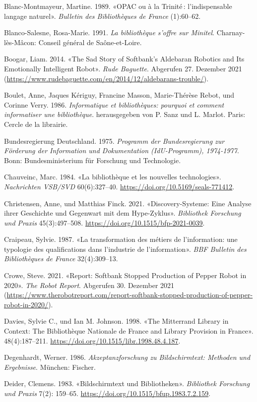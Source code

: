 \documentclass[a4paper,
fontsize=11pt,
oneside,
numbers=noperiodatend,
parskip=half-,
bibliography=totoc,
final
]{scrartcl}
\begin{document}
Blanc-Montmayeur, Martine. 1989. «OPAC ou à la Trinité\,:
l'indispensable langage naturel». \emph{Bulletin des Bibliothèques de
France} (1):60--62.

Blanco-Salesne, Rosa-Marie. 1991. \emph{La bibliothèque s'offre sur
Minitel}. Charnay-lès-Mâcon: Conseil général de Saône-et-Loire.

Boogar, Liam. 2014. «The Sad Story of Softbank's Aldebaran Robotics and
Its Emotionally Intelligent Robot». \emph{Rude Baguette}. Abgerufen 27.
Dezember 2021
(\url{https://www.rudebaguette.com/en/2014/12/aldebarans-trouble/}).

Boulet, Anne, Jaques Kériguy, Francine Masson, Marie-Thérèse Rebot, und
Corinne Verry. 1986. \emph{Informatique et bibliothèques: pourquoi et
comment informatiser une bibliothèque}. herausgegeben von P. Sanz und L.
Marlot. Paris: Cercle de la librairie.

Bundesregierung Deutschland. 1975. \emph{Programm der Bundesregierung
zur Förderung der Information und Dokumentation (IdU-Programm),
1974-1977}. Bonn: Bundesministerium für Forschung und Technologie.

Chauveinc, Marc. 1984. «La bibliothèque et les nouvelles technologies».
\emph{Nachrichten VSB/SVD} 60(6):327--40.
\url{https://doi.org/10.5169/seals-771412}.

Christensen, Anne, und Matthias Finck. 2021. «Discovery-Systeme: Eine
Analyse ihrer Geschichte und Gegenwart mit dem Hype-Zyklus».
\emph{Bibliothek Forschung und Praxis} 45(3):497--508.
\url{https://doi.org/10.1515/bfp-2021-0039}.

Craipeau, Sylvie. 1987. «La transformation des métiers de l'information:
une typologie des qualifications dans l'industrie de l'information».
\emph{BBF Bulletin des Bibliothèques de France} 32(4):309--13.

Crowe, Steve. 2021. «Report: Softbank Stopped Production of Pepper Robot
in 2020». \emph{The Robot Report}. Abgerufen 30. Dezember 2021
(\url{https://www.therobotreport.com/report-softbank-stopped-production-of-pepper-robot-in-2020/}).

Davies, Sylvie C., und Ian M. Johnson. 1998. «The Mitterrand Library in
Context: The Bibliothèque Nationale de France and Library Provision in
France». 48(4):187--211.
\url{https://doi.org/10.1515/libr.1998.48.4.187}.

Degenhardt, Werner. 1986. \emph{Akzeptanzforschung zu Bildschirmtext:
Methoden und Ergebnisse}. München: Fischer.

Deider, Clemens. 1983. «Bildschirmtext und Bibliotheken».
\emph{Bibliothek Forschung und Praxis} 7(2): 159--65.
\url{https://doi.org/10.1515/bfup.1983.7.2.159}.
\end{document}
